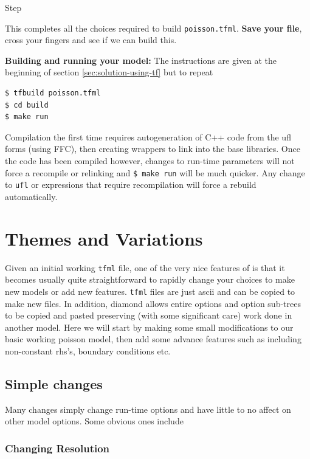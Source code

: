 \begin{steps}{Step}
\begin{center}
\end{center}
This completes all the choices required to build
\texttt{poisson.tfml}. \textbf{Save your file}, cross your fingers and see if
we can build this.
\item \textbf{Building and running your model:}  The instructions are
  given at the beginning of section \ref{sec:solution-using-tf} but to
  repeat
\begin{lstlisting}[style=Bash]
$ tfbuild poisson.tfml
$ cd build
$ make run 
\end{lstlisting} %
Compilation the first time requires autogeneration of C++ code from
the ufl forms (using FFC), then creating wrappers to link into the
base \TF libraries.  Once the code has been compiled however, changes
to run-time parameters will not force a recompile or relinking and
\lstinline[style=Bash]´$ make run´ %
will be much quicker.  Any change to \texttt{ufl} or expressions that
require recompilation will force a rebuild automatically.
 \end{steps}
  




\section{Themes and Variations}
\label{sec:themes-variations}

Given an initial working \texttt{tfml} file, one of the very nice
features of \TF{} is that it becomes usually quite straightforward to
rapidly change your choices to make new models or add new features.
\texttt{tfml} files are just ascii and can be copied to make new
files. In addition,  diamond allows entire options and option
sub-trees to be copied and pasted preserving (with some significant
care) work done in another model.  Here we will start by making some
small modifications to our basic working poisson model, then add some
advance features such as including non-constant rhs's, boundary
conditions etc.

\subsection{Simple changes}
\label{sec:simple-changes}

Many changes simply change run-time options and have little to no
affect on other model options.  Some obvious ones include
\subsubsection{Changing Resolution}
\label{sec:changing-elements}

